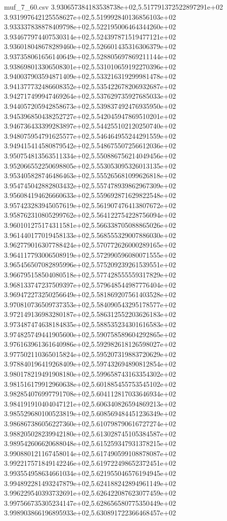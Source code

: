 \begin{filecontents*}{muf_7_60.csv}
3.930657384183538738e+02,5.517791372522897291e+02
3.931997642125558627e+02,5.519992840136856103e+02
3.933337838878409798e+02,5.522195006464344260e+02
3.934677974407530314e+02,5.524397871519477121e+02
3.936018048678289460e+02,5.526601435316306379e+02
3.937358061656140649e+02,5.528805697869211144e+02
3.938698013306508301e+02,5.531010659192270396e+02
3.940037903594871409e+02,5.533216319299981478e+02
3.941377732486608352e+02,5.535422678206932687e+02
3.942717499947469264e+02,5.537629735927685033e+02
3.944057205942858673e+02,5.539837492476935950e+02
3.945396850438252727e+02,5.542045947869510201e+02
3.946736433399283897e+02,5.544255102120250740e+02
3.948075954791625577e+02,5.546464955244291559e+02
3.949415414580879542e+02,5.548675507256612036e+02
3.950754813563511334e+02,5.550886756214049456e+02
3.952066552250698805e+02,5.553053095326013135e+02
3.953405828746486463e+02,5.555265681099626818e+02
3.954745042882803432e+02,5.557478939862967309e+02
3.956084194626660633e+02,5.559692871629822548e+02
3.957423283945057619e+02,5.561907476413807672e+02
3.958762310805299762e+02,5.564122754228756094e+02
3.960101275174311581e+02,5.566338705088865026e+02
3.961440177019458133e+02,5.568555329007886030e+02
3.962779016307788424e+02,5.570772626000289165e+02
3.964117793006508919e+02,5.572990596080071555e+02
3.965456507082895996e+02,5.575209239261539551e+02
3.966795158504080518e+02,5.577428555559317829e+02
3.968133747237509397e+02,5.579648544987776404e+02
3.969472273250256649e+02,5.581869207561403528e+02
3.970810736509737353e+02,5.584090543295178577e+02
3.972149136983280187e+02,5.586312552203626183e+02
3.973487474638184835e+02,5.588535234301616583e+02
3.974825749441905600e+02,5.590758589604292865e+02
3.976163961361640986e+02,5.592982618126598027e+02
3.977502110365015824e+02,5.595207319883720629e+02
3.978840196419268409e+02,5.597432694890812854e+02
3.980178219491908180e+02,5.599658743163354302e+02
3.981516179912960638e+02,5.601885455753545102e+02
3.982854076997791708e+02,5.604112817033646934e+02
3.984191910404047121e+02,5.606340826594869213e+02
3.985529680100523819e+02,5.608569484451236349e+02
3.986867386056227360e+02,5.610798790616727274e+02
3.988205028239942180e+02,5.613028745105384587e+02
3.989542606620688048e+02,5.615259347931378215e+02
3.990880121167458014e+02,5.617490599108878087e+02
3.992217571849142246e+02,5.619722498652372451e+02
3.993554958634661034e+02,5.621955046576194945e+02
3.994892281493247879e+02,5.624188242894961149e+02
3.996229540393732691e+02,5.626422087623077459e+02
3.997566735305234147e+02,5.628656580775350449e+02
3.998903866196895933e+02,5.630891722366468457e+02

\end{filecontents*}
